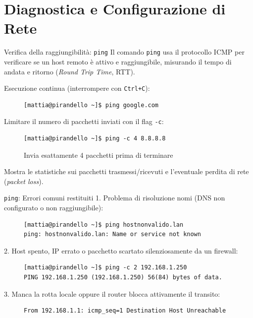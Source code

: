 \section{Diagnostica e Configurazione di Rete}

\begin{frame}[fragile]{Verifica della raggiungibilità: \texttt{ping}}
  Il comando \texttt{ping} usa il protocollo ICMP per verificare se un host remoto è attivo e raggiungibile, misurando il tempo di andata e ritorno (\textit{Round Trip Time}, RTT).

  Esecuzione continua (interrompere con \texttt{Ctrl+C}):
  \begin{figure}
    \begin{lstlisting}[backgroundcolor=\color{expowhite!50!white}]
[mattia@pirandello ~]$ ping google.com
\end{lstlisting}
  \end{figure}

  Limitare il numero di pacchetti inviati con il flag \texttt{-c}:
  \begin{figure}
    \begin{lstlisting}[backgroundcolor=\color{expowhite!50!white}]
[mattia@pirandello ~]$ ping -c 4 8.8.8.8
\end{lstlisting}
    \caption{Invia esattamente 4 pacchetti prima di terminare}
  \end{figure}\medskip

  Mostra le statistiche sui pacchetti trasmessi/ricevuti e l'eventuale perdita di rete (\textit{packet loss}).
\end{frame}

\begin{frame}[fragile]{\texttt{ping}: Errori comuni restituiti}
  1. Problema di risoluzione nomi (DNS non configurato o non raggiungibile):
  \begin{figure}
    \begin{lstlisting}[backgroundcolor=\color{expowhite!50!white}]
[mattia@pirandello ~]$ ping hostnonvalido.lan
ping: hostnonvalido.lan: Name or service not known
\end{lstlisting}
  \end{figure}

  2. Host spento, IP errato o pacchetto scartato silenziosamente da un firewall:
  \begin{figure}
    \begin{lstlisting}[backgroundcolor=\color{expowhite!50!white}]
[mattia@pirandello ~]$ ping -c 2 192.168.1.250
PING 192.168.1.250 (192.168.1.250) 56(84) bytes of data.
\end{lstlisting}
  \end{figure}

  3. Manca la rotta locale oppure il router blocca attivamente il transito:
  \begin{figure}
    \begin{lstlisting}[backgroundcolor=\color{expowhite!50!white}]
From 192.168.1.1: icmp_seq=1 Destination Host Unreachable
\end{lstlisting}
  \end{figure}
\end{frame}


